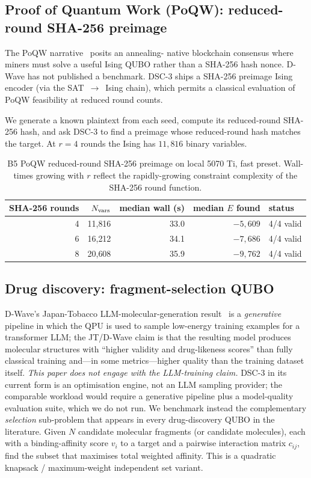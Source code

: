 \documentclass[11pt,a4paper]{article}
\begin{document}
\subsection{Proof of Quantum Work (PoQW): reduced-round SHA-256 preimage}

The PoQW narrative~\cite{noahbean_arms_race_2026} posits an annealing-
native blockchain consensus where miners must solve a useful Ising
QUBO rather than a SHA-256 hash nonce. D-Wave has not published a
benchmark. DSC-3 ships a SHA-256 preimage Ising encoder (via the
SAT~$\to$~Ising chain), which permits a classical evaluation of PoQW
feasibility at reduced round counts.

We generate a known plaintext from each seed, compute its
reduced-round SHA-256 hash, and ask DSC-3 to find a preimage whose
reduced-round hash matches the target. At $r\!=\!4$ rounds the Ising
has $11{,}816$ binary variables.

\begin{table}[h]
\centering
\caption{B5 PoQW reduced-round SHA-256 preimage on local 5070 Ti,
fast preset. Wall-times growing with $r$ reflect the rapidly-growing
constraint complexity of the SHA-256 round function.}
\label{tab:b5_poqw}
\small
\begin{tabular}{rrrrl}
\toprule
SHA-256 rounds & $N_{\rm vars}$ & median wall (s) & median $E$ found & status \\
\midrule
4 & 11{,}816 & 33.0 & $-5{,}609$ & 4/4 valid \\
6 & 16{,}212 & 34.1 & $-7{,}686$ & 4/4 valid \\
8 & 20{,}608 & 35.9 & $-9{,}762$ & 4/4 valid \\
\bottomrule
\end{tabular}
\end{table}

\subsection{Drug discovery: fragment-selection QUBO}

D-Wave's Japan-Tobacco LLM-molecular-generation result~\cite{jt_dwave_2025}
is a \emph{generative} pipeline in which the QPU is used to sample
low-energy training examples for a transformer LLM; the JT/D-Wave claim
is that the resulting model produces molecular structures with
``higher validity and drug-likeness scores'' than fully classical
training and---in some metrics---higher quality than the training
dataset itself. \emph{This paper does not engage with the
LLM-training claim.} DSC-3 in its current form is an optimisation
engine, not an LLM sampling provider; the comparable workload would
require a generative pipeline plus a model-quality evaluation suite,
which we do not run. We benchmark instead the complementary
\emph{selection} sub-problem that appears in every drug-discovery
QUBO in the literature. Given $N$ candidate molecular
fragments (or candidate molecules), each with a binding-affinity score
$v_i$ to a target and a pairwise interaction matrix $c_{ij}$, find the
subset that maximises total weighted affinity. This is a quadratic
knapsack / maximum-weight independent set variant.
\end{document}
